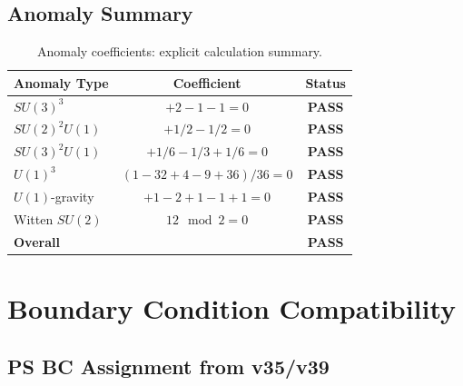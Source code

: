\documentclass[11pt,a4paper]{article}
\begin{document}
\subsection{Anomaly Summary}

\begin{table}[h]
\centering
\caption{Anomaly coefficients: explicit calculation summary.}
\label{tab:anomaly-summary}
\begin{tabular}{lcc}
\toprule
Anomaly Type & Coefficient & Status \\
\midrule
$SU(3)^3$ & $+2 - 1 - 1 = 0$ & \textcolor{green!60!black}{\textbf{PASS}} \\
$SU(2)^2 U(1)$ & $+1/2 - 1/2 = 0$ & \textcolor{green!60!black}{\textbf{PASS}} \\
$SU(3)^2 U(1)$ & $+1/6 - 1/3 + 1/6 = 0$ & \textcolor{green!60!black}{\textbf{PASS}} \\
$U(1)^3$ & $(1-32+4-9+36)/36 = 0$ & \textcolor{green!60!black}{\textbf{PASS}} \\
$U(1)$-gravity & $+1 - 2 + 1 - 1 + 1 = 0$ & \textcolor{green!60!black}{\textbf{PASS}} \\
Witten $SU(2)$ & $12 \mod 2 = 0$ & \textcolor{green!60!black}{\textbf{PASS}} \\
\midrule
\textbf{Overall} & & \textcolor{green!60!black}{\textbf{PASS}} \\
\bottomrule
\end{tabular}
\end{table}

\section{Boundary Condition Compatibility}
\label{sec:bc-compat}

\subsection{PS BC Assignment from v35/v39}
\end{document}

